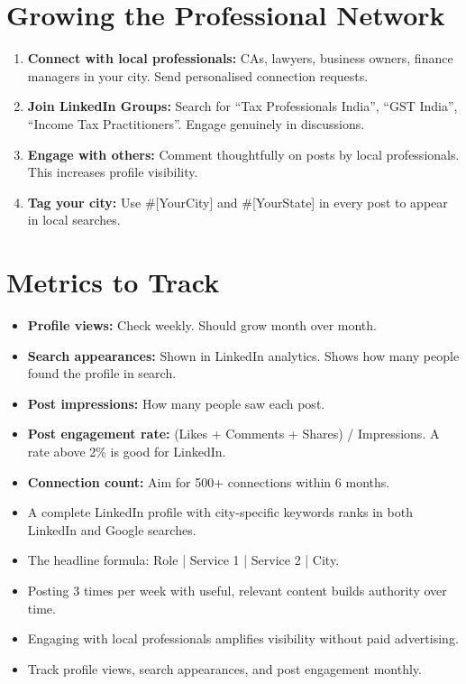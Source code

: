 \documentclass[12pt, a4paper]{book}
\begin{document}
\section{Growing the Professional Network}

\begin{enumerate}[leftmargin=1.5em]
  \item \textbf{Connect with local professionals:} CAs, lawyers, business owners,
        finance managers in your city. Send personalised connection requests.
  \item \textbf{Join LinkedIn Groups:} Search for ``Tax Professionals India'',
        ``GST India'', ``Income Tax Practitioners''. Engage genuinely in discussions.
  \item \textbf{Engage with others:} Comment thoughtfully on posts by local professionals.
        This increases profile visibility.
  \item \textbf{Tag your city:} Use \#[YourCity] and \#[YourState] in every post
        to appear in local searches.
\end{enumerate}

\section{Metrics to Track}

\begin{itemize}[leftmargin=1.5em]
  \item \textbf{Profile views:} Check weekly. Should grow month over month.
  \item \textbf{Search appearances:} Shown in LinkedIn analytics. Shows how many people
        found the profile in search.
  \item \textbf{Post impressions:} How many people saw each post.
  \item \textbf{Post engagement rate:} (Likes + Comments + Shares) / Impressions.
        A rate above 2\% is good for LinkedIn.
  \item \textbf{Connection count:} Aim for 500+ connections within 6 months.
\end{itemize}

\begin{tcolorbox}[learnedbox]
\begin{itemize}
  \item A complete LinkedIn profile with city-specific keywords ranks in both LinkedIn and Google searches.
  \item The headline formula: Role | Service 1 | Service 2 | City.
  \item Posting 3 times per week with useful, relevant content builds authority over time.
  \item Engaging with local professionals amplifies visibility without paid advertising.
  \item Track profile views, search appearances, and post engagement monthly.
\end{itemize}
\end{tcolorbox}
\end{document}
